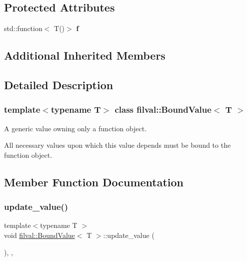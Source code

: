 \subsection*{Protected Attributes}
\begin{DoxyCompactItemize}
\item 
\hypertarget{classfilval_1_1BoundValue_ae95f1b20407397dfbf84c18722a01c05}{}\label{classfilval_1_1BoundValue_ae95f1b20407397dfbf84c18722a01c05} 
std\+::function$<$ T()$>$ {\bfseries f}
\end{DoxyCompactItemize}
\subsection*{Additional Inherited Members}


\subsection{Detailed Description}
\subsubsection*{template$<$typename T$>$\newline
class filval\+::\+Bound\+Value$<$ T $>$}

A generic value owning only a function object. 

All necessary values upon which this value depends must be bound to the function object. 

\subsection{Member Function Documentation}
\hypertarget{classfilval_1_1BoundValue_a90be966f85204cac57075e4ee66f2fa9}{}\label{classfilval_1_1BoundValue_a90be966f85204cac57075e4ee66f2fa9} 
\subsubsection{\texorpdfstring{update\+\_\+value()}{update\_value()}}
{\footnotesize\ttfamily template$<$typename T $>$ \\
void \hyperlink{classfilval_1_1BoundValue}{filval\+::\+Bound\+Value}$<$ T $>$\+::update\+\_\+value (\begin{DoxyParamCaption}{ }\end{DoxyParamCaption})\hspace{0.3cm}{\ttfamily [inline]}, {\ttfamily [protected]}, {\ttfamily [virtual]}}



